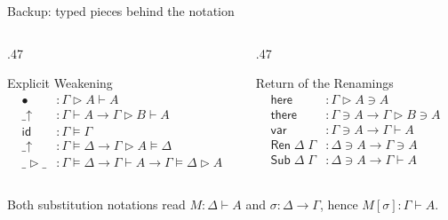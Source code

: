 \documentclass[pdftex,aspectratio=169]{beamer}
\newcommand{\Blob}{\ensuremath{\bullet}}
\newcommand{\Wk}{\ensuremath{\mathord{\uparrow}}}
\begin{document}
\begin{frame}{Backup: typed pieces behind the notation}
  \small
  \begin{columns}[T,onlytextwidth]
    \begin{column}{.47\textwidth}
      \begin{block}{Explicit Weakening}
        \[
        \begin{array}{ll}
          \Blob &: \Gamma\rhd A \vdash A\\
          \_\Wk &: \Gamma\vdash A \to \Gamma\rhd B\vdash A\\
          \mathsf{id} &: \Gamma\models\Gamma\\
          \_\Wk &: \Gamma\models\Delta \to \Gamma\rhd A\models\Delta\\
          \_\rhd\_ &: \Gamma\models\Delta \to \Gamma\vdash A
            \to \Gamma\models\Delta\rhd A
        \end{array}
        \]
      \end{block}
    \end{column}
    \begin{column}{.47\textwidth}
      \begin{block}{Return of the Renamings}
        \[
        \begin{array}{ll}
          \mathsf{here} &: \Gamma\rhd A \ni A\\
          \mathsf{there} &: \Gamma\ni A \to \Gamma\rhd B\ni A\\
          \mathsf{var} &: \Gamma\ni A \to \Gamma\vdash A\\
          \mathsf{Ren}\;\Delta\;\Gamma &: \Delta\ni A \to \Gamma\ni A\\
          \mathsf{Sub}\;\Delta\;\Gamma &: \Delta\ni A \to \Gamma\vdash A
        \end{array}
        \]
      \end{block}
    \end{column}
  \end{columns}

  \vspace{.5em}
  \centering
  Both substitution notations read \(M:\Delta\vdash A\) and
  \(\sigma:\Delta\to\Gamma\),
  hence \(M[\sigma]:\Gamma\vdash A\).
\end{frame}
\end{document}
